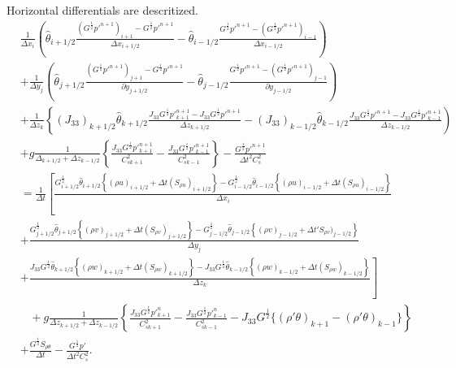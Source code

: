 Horizontal differentials are descritized.
\begin{align}
  & \frac{1}{\Delta x_i}\left(
   \hat{\theta}_{i+1/2}\frac{(G^{\frac{1}{2}}p'^{n+1})_{i+1}-G^{\frac{1}{2}}p'^{n+1}}{\Delta x_{i+1/2}}
  -\hat{\theta}_{i-1/2}\frac{G^{\frac{1}{2}}p'^{n+1}-(G^{\frac{1}{2}}p'^{n+1})_{i-1}}{\Delta x_{i-1/2}}
  \right) \nonumber\\&
  + \frac{1}{\Delta y_j}\left(
   \hat{\theta}_{j+1/2}\frac{(G^{\frac{1}{2}}p'^{n+1})_{j+1}-G^{\frac{1}{2}}p'^{n+1}}{\partial y_{j+1/2}}
  -\hat{\theta}_{j-1/2}\frac{G^{\frac{1}{2}}p'^{n+1}-(G^{\frac{1}{2}}p'^{n+1})_{j-1}}{\partial y_{j-1/2}}
 \right) \nonumber\\&
  + \frac{1}{\Delta z_k}\left\{
   (J_{33})_{k+1/2}\hat{\theta}_{k+1/2}\frac{J_{33}G^{\frac{1}{2}}p'^{n+1}_{k+1}-J_{33}G^{\frac{1}{2}}p'^{n+1}}{\Delta z_{k+1/2}}
  -(J_{33})_{k-1/2}\hat{\theta}_{k-1/2}\frac{J_{33}G^{\frac{1}{2}}p'^{n+1}-J_{33}G^{\frac{1}{2}}p'^{n+1}_{k-1}}{\Delta z_{k-1/2}}
  \right) \nonumber\\&
  + g \frac{1}{\Delta_{k+1/2}+\Delta z_{k-1/2}} \left\{
   \frac{J_{33}G^{\frac{1}{2}}p'^{n+1}_{k+1}}{C^2_{s k+1}}
  -\frac{J_{33}G^{\frac{1}{2}}p'^{n+1}_{k-1}}{C^2_{s k-1}} \right\}
  - \frac{G^{\frac{1}{2}}p'^{n+1}}{\Delta t^2 C^2_s} \nonumber\\
  &=
  \frac{1}{\Delta t}\left[
      \frac{
         G^{\frac{1}{2}}_{i+1/2}\hat{\theta}_{i+1/2}\left\{(\rho u)_{i+1/2} + \Delta t (S_{\rho u})_{i+1/2}\right\}
        -G^{\frac{1}{2}}_{i-1/2}\hat{\theta}_{i-1/2}\left\{(\rho u)_{i-1/2} + \Delta t (S_{\rho u})_{i-1/2}\right\}
      }{\Delta x_i} \right.\nonumber\\&
    + \frac{
        G^{\frac{1}{2}}_{j+1/2}\hat{\theta}_{j+1/2}\left\{(\rho v)_{j+1/2} + \Delta t (S_{\rho v})_{j+1/2}\right\}
       -G^{\frac{1}{2}}_{j-1/2}\hat{\theta}_{j-1/2}\left\{(\rho v)_{j-1/2} + \Delta t 'S_{\rho v})_{j-1/2}\right\}
      }{\Delta y_j} \nonumber\\& \left.
    + \frac{
        J_{33}G^{\frac{1}{2}}\hat{\theta}_{k+1/2}\left\{(\rho w)_{k+1/2} + \Delta t (S_{\rho w})_{k+1/2}\right\}
       -J_{33}G^{\frac{1}{2}}\hat{\theta}_{k-1/2}\left\{(\rho w)_{k-1/2} + \Delta t (S_{\rho w})_{k-1/2}\right\}
      }{\Delta z_k}
    \right] \nonumber\\&\;\;\;
  + g \frac{1}{\Delta z_{k+1/2}+\Delta z_{k-1/2}}\left\{
    \frac{J_{33}G^{\frac{1}{2}}p'^n_{k+1}}{C^2_{s k+1}}
   -\frac{J_{33}G^{\frac{1}{2}}p'^n_{k-1}}{C^2_{s k-1}}
   - J_{33}G^{\frac{1}{2}} \{(\rho'\theta)_{k+1} - (\rho'\theta)_{k-1}\}
  \right\} \nonumber\\&
  + \frac{G^{\frac{1}{2}} S_{\rho\theta}}{\Delta t}
  - \frac{G^{\frac{1}{2}}p'}{\Delta t^2 C^2_s}.
\end{align}
